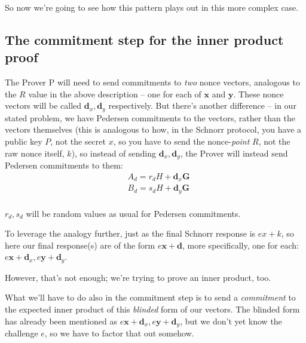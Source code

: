 \documentclass[10pt,a4paper]{article}
\begin{document}
So now we're going to see how this pattern plays out in this more
complex case.

\hypertarget{the-commitment-step-for-the-inner-product-proof}{%
\subsection[The commitment step for the inner product
proof]{\texorpdfstring{\protect\hypertarget{anchor-36}{}{}The commitment
step for the inner product
proof}{The commitment step for the inner product proof}}\label{the-commitment-step-for-the-inner-product-proof}}

The Prover P will need to send commitments to \emph{two } nonce vectors, analogous to the
$R$ value in the above description -- one for each of $\mathbf{x}$ and
$\mathbf{y}$. These nonce vectors will be called $\mathbf{d}_x, \mathbf{d}_y$ respectively. But there's another
difference -- in our stated problem, we have Pedersen commitments to the
vectors, rather than the vectors themselves (this is analogous to how,
in the Schnorr protocol, you have a public key $P$, not the secret $x$, so you
have to send the nonce-\emph{point} $R$, not the raw nonce itself, $k$), so
instead of sending $\mathbf{d}_x, \mathbf{d}_y$, the Prover will instead send Pedersen commitments
to them:
\begin{align*}
&A_d = r_d H + \mathbf{d}_x\mathbf{G} \\
&B_d = s_d H + \mathbf{d}_y\mathbf{G} \\
\end{align*}

$r_d, s_d$ will be random values as usual for Pedersen commitments.

To leverage the analogy further, just as the final Schnorr response is $ex+k$,
so here our final response(s) are of the form $e\mathbf{x}+\mathbf{d}$, more specifically, one for each: $e\mathbf{x} + \mathbf{d}_x, e\mathbf{y}+\mathbf{d}_y$.

However, that's not enough; we're trying to prove an inner product, too.

What we'll have to do also in the commitment step is to send a
\emph{commitment} to the expected inner product of this \emph{blinded}
form of our vectors. The blinded form has already been mentioned as $e\mathbf{x} + \mathbf{d}_x, e\mathbf{y}+\mathbf{d}_y$,
but we don't yet know the challenge $e$, so we have to factor that out
somehow.
\end{document}
